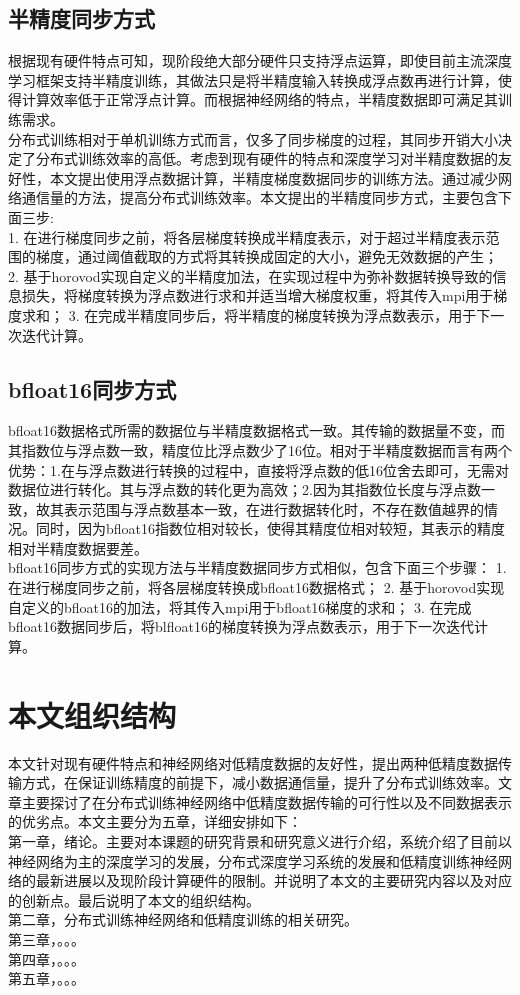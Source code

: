\subsection{半精度同步方式}
根据现有硬件特点可知，现阶段绝大部分硬件只支持浮点运算，即使目前主流深度学习框架支持半精度训练，其做法只是将半精度输入转换成浮点数再进行计算，使得计算效率低于正常浮点计算。而根据神经网络的特点，半精度数据即可满足其训练需求。\\
分布式训练相对于单机训练方式而言，仅多了同步梯度的过程，其同步开销大小决定了分布式训练效率的高低。考虑到现有硬件的特点和深度学习对半精度数据的友好性，本文提出使用浮点数据计算，半精度梯度数据同步的训练方法。通过减少网络通信量的方法，提高分布式训练效率。本文提出的半精度同步方式，主要包含下面三步:\\
1. 在进行梯度同步之前，将各层梯度转换成半精度表示，对于超过半精度表示范围的梯度，通过阈值截取的方式将其转换成固定的大小，避免无效数据的产生；
2. 基于horovod实现自定义的半精度加法，在实现过程中为弥补数据转换导致的信息损失，将梯度转换为浮点数进行求和并适当增大梯度权重，将其传入mpi用于梯度求和；
3. 在完成半精度同步后，将半精度的梯度转换为浮点数表示，用于下一次迭代计算。

\subsection{bfloat16同步方式}
bfloat16数据格式所需的数据位与半精度数据格式一致。其传输的数据量不变，而其指数位与浮点数一致，精度位比浮点数少了16位。相对于半精度数据而言有两个优势：1.在与浮点数进行转换的过程中，直接将浮点数的低16位舍去即可，无需对数据位进行转化。其与浮点数的转化更为高效；2.因为其指数位长度与浮点数一致，故其表示范围与浮点数基本一致，在进行数据转化时，不存在数值越界的情况。同时，因为bfloat16指数位相对较长，使得其精度位相对较短，其表示的精度相对半精度数据要差。\\
bfloat16同步方式的实现方法与半精度数据同步方式相似，包含下面三个步骤：
1. 在进行梯度同步之前，将各层梯度转换成bfloat16数据格式；
2. 基于horovod实现自定义的bfloat16的加法，将其传入mpi用于bfloat16梯度的求和；
3. 在完成bfloat16数据同步后，将blfloat16的梯度转换为浮点数表示，用于下一次迭代计算。
\section{本文组织结构}
本文针对现有硬件特点和神经网络对低精度数据的友好性，提出两种低精度数据传输方式，在保证训练精度的前提下，减小数据通信量，提升了分布式训练效率。文章主要探讨了在分布式训练神经网络中低精度数据传输的可行性以及不同数据表示的优劣点。本文主要分为五章，详细安排如下：\\
第一章，绪论。主要对本课题的研究背景和研究意义进行介绍，系统介绍了目前以神经网络为主的深度学习的发展，分布式深度学习系统的发展和低精度训练神经网络的最新进展以及现阶段计算硬件的限制。并说明了本文的主要研究内容以及对应的创新点。最后说明了本文的组织结构。\\
第二章，分布式训练神经网络和低精度训练的相关研究。\\
第三章，。。。\\
第四章，。。。\\
第五章，。。。\\








